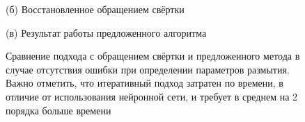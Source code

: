 \begin{figure}[H]
\begin{minipage}[t]{0.3\linewidth}
(б) Восстановленное обращением свёртки\\ 
\end{minipage}
\hfill
\begin{minipage}[t]{0.3\linewidth}
(в) Результат работы предложенного алгоритма\\ 
\end{minipage}
\caption{ Сравнение подхода с обращением свёртки и предложенного метода в случае отсутствия ошибки при определении параметров размытия. Важно отметить, что итеративный подход затратен по времени, в отличие от использования нейронной сети, и требует в среднем на 2 порядка больше времени}
\label{ris:restore_comparison}
\end{figure}






